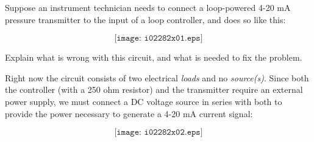 

Suppose an instrument technician needs to connect a loop-powered 4-20 mA pressure transmitter to the input of a loop controller, and does so like this:

$$\texttt{[image: i02282x01.eps]}$$

Explain what is wrong with this circuit, and what is needed to fix the problem.







Right now the circuit consists of two electrical {\it loads} and no {\it source(s)}.  Since both the controller (with a 250 ohm resistor) and the transmitter require an external power supply, we must connect a DC voltage source in series with both to provide the power necessary to generate a 4-20 mA current signal:

$$\texttt{[image: i02282x02.eps]}$$











